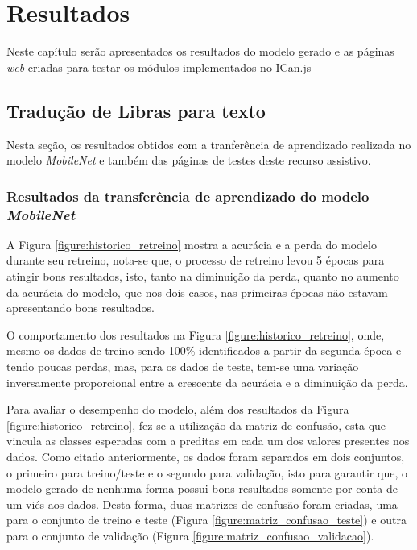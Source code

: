 \newpage
\chapter{Resultados}

\par Neste capítulo serão apresentados os resultados do modelo gerado e as páginas \textit{web} criadas para testar os módulos implementados no ICan.js

\section{Tradução de Libras para texto}

\par Nesta seção, os resultados obtidos com a tranferência de aprendizado realizada no modelo \textit{MobileNet} e também das páginas de testes deste recurso assistivo.

\subsection{Resultados da transferência de aprendizado do modelo \textit{MobileNet}}


\par A Figura \ref{figure:historico_retreino} mostra a acurácia e a perda do modelo durante seu retreino, nota-se que, o processo de retreino levou 5 épocas para atingir bons resultados, isto, tanto na diminuição da perda, quanto no aumento da acurácia do modelo, que nos dois casos, nas primeiras épocas não estavam apresentando bons resultados.

\par O comportamento dos resultados na Figura \ref{figure:historico_retreino}, onde, mesmo os dados de treino sendo 100\% identificados a partir da segunda época e tendo poucas perdas, mas, para os dados de teste, tem-se uma variação inversamente proporcional entre a crescente da acurácia e a diminuição da perda. 

\par Para avaliar o desempenho do modelo, além dos resultados da Figura \ref{figure:historico_retreino}, fez-se a utilização da matriz de confusão, esta que vincula as classes esperadas com a preditas em cada um dos valores presentes nos dados. Como citado anteriormente, os dados foram separados em dois conjuntos, o primeiro para treino/teste e o segundo para validação, isto para garantir que, o modelo gerado de nenhuma forma possui bons resultados somente por conta de um viés aos dados. Desta forma, duas matrizes de confusão foram criadas, uma para o conjunto de treino e teste (Figura \ref{figure:matriz_confusao_teste}) e outra para o conjunto de validação (Figura \ref{figure:matriz_confusao_validacao}).

